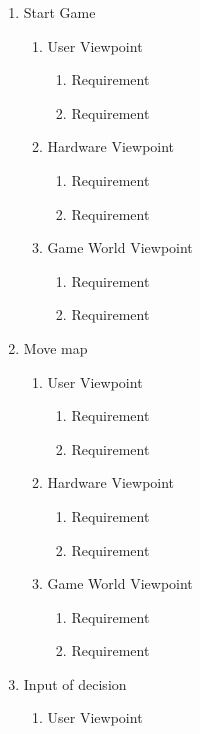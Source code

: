 \documentclass[]{article}
\begin{document}
\begin{enumerate}[{BE}1.]
\begin{enumerate}[{VP4}.1]
		\end{enumerate}
		\item Start Game
	\begin{enumerate}[{VP5}.1]
		\item User Viewpoint
			\begin{enumerate}
				\item Requirement
				\item Requirement
			\end{enumerate}
		\item Hardware Viewpoint
			\begin{enumerate}
				\item Requirement
				\item Requirement
			\end{enumerate}
		\item Game World Viewpoint
			\begin{enumerate}
				\item Requirement
				\item Requirement
			\end{enumerate}			
	\end{enumerate}
	\item Move map
		\begin{enumerate}[{VP6}.1]
			\item User Viewpoint
			\begin{enumerate}
				\item Requirement
				\item Requirement
			\end{enumerate}
		\item Hardware Viewpoint
			\begin{enumerate}
				\item Requirement
				\item Requirement
			\end{enumerate}
		\item Game World Viewpoint
			\begin{enumerate}
				\item Requirement
				\item Requirement
			\end{enumerate}			
	\end{enumerate}
		\item Input of decision
	\begin{enumerate}[{VP7}.1]
		\item User Viewpoint

\end{enumerate}
\end{enumerate}
\end{document}
